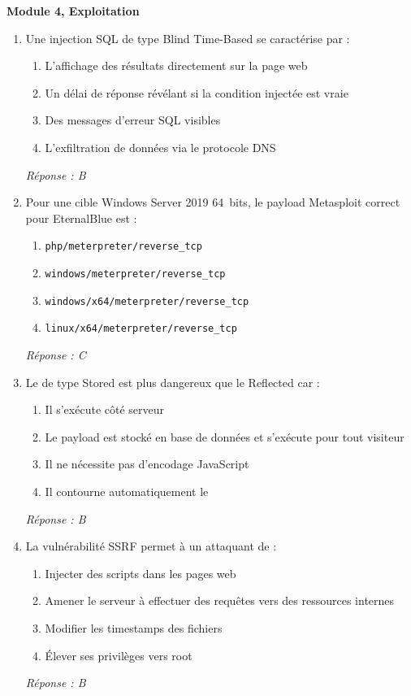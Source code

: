 \medskip
\noindent\textbf{Module 4, Exploitation}

\begin{enumerate}[resume]

\item Une injection SQL de type \og{}Blind Time-Based\fg{} se caractérise par :
\begin{enumerate}[label=\Alph*.]
    \item L'affichage des résultats directement sur la page web
    \item Un délai de réponse révélant si la condition injectée est vraie
    \item Des messages d'erreur SQL visibles
    \item L'exfiltration de données via le protocole DNS
\end{enumerate}
\textit{Réponse : B}

\item Pour une cible Windows Server 2019 64~bits, le payload Metasploit
      correct pour EternalBlue est :
\begin{enumerate}[label=\Alph*.]
    \item \texttt{php/meterpreter/reverse\_tcp}
    \item \texttt{windows/meterpreter/reverse\_tcp}
    \item \texttt{windows/x64/meterpreter/reverse\_tcp}
    \item \texttt{linux/x64/meterpreter/reverse\_tcp}
\end{enumerate}
\textit{Réponse : C}

\item Le  de type \og{}Stored\fg{} est plus dangereux que le
      \og{}Reflected\fg{} car :
\begin{enumerate}[label=\Alph*.]
    \item Il s'exécute côté serveur
    \item Le payload est stocké en base de données et s'exécute pour tout visiteur
    \item Il ne nécessite pas d'encodage JavaScript
    \item Il contourne automatiquement le 
\end{enumerate}
\textit{Réponse : B}

\item La vulnérabilité SSRF permet à un attaquant de :
\begin{enumerate}[label=\Alph*.]
    \item Injecter des scripts dans les pages web
    \item Amener le serveur à effectuer des requêtes vers des ressources internes
    \item Modifier les timestamps des fichiers
    \item Élever ses privilèges vers root
\end{enumerate}
\textit{Réponse : B}


\end{enumerate}
